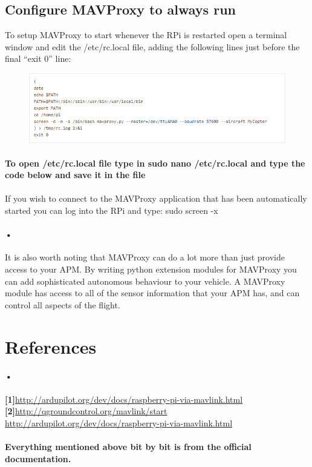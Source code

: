 \documentclass[11pt,a4paper]{article}
\begin{document}
			\subsection{Configure MAVProxy to always run}
				To setup MAVProxy to start whenever the RPi is restarted open a terminal window and edit the /etc/rc.local file, adding the following lines just before the final “exit 0” line: 
				\begin{figure}[H]
	 	\centering
		\includegraphics[scale=0.75]{command}
		
\end{figure}
\paragraph{To open /etc/rc.local file type in sudo nano /etc/rc.local and type the code below and save it in the file}
\paragraph{}If you wish to connect to the MAVProxy application that has been automatically started you can log into the RPi and type: sudo screen -x
\paragraph{•}It is also worth noting that MAVProxy can do a lot more than just provide access to your APM. By writing python extension modules for MAVProxy you can add sophisticated autonomous behaviour to your vehicle. A MAVProxy module has access to all of the sensor information that your APM has, and can control all aspects of the flight.
	\section{References}
	\paragraph{•}
	\textbf{[1]}\url{http://ardupilot.org/dev/docs/raspberry-pi-via-mavlink.html}
	\textbf{[2]}\url{http://qgroundcontrol.org/mavlink/start}
	\url{http://ardupilot.org/dev/docs/raspberry-pi-via-mavlink.html}
		
	\paragraph{Everything mentioned above bit by bit is from the official documentation.}
	
\end{document}
